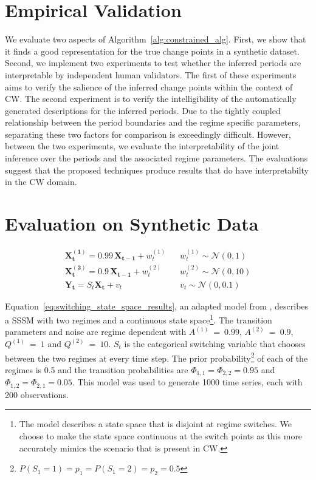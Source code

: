 \section{Empirical Validation}\label{sec:user_evaluation}
We evaluate two aspects of Algorithm~\ref{alg:constrained_alg}. First, we show that it finds a good representation for the true change points in a synthetic dataset. Second, we implement two experiments to test whether the inferred periods are interpretable by independent human validators. The first of these experiments aims to verify the salience of the inferred change points within the context of CW. The second experiment is to verify the intelligibility of the automatically generated descriptions for the inferred periods. Due to the tightly coupled relationship between the period boundaries and the regime specific parameters, separating these two factors for comparison is exceedingly difficult. However, between the two experiments, we evaluate the interpretability of the joint inference over the periods and the associated regime parameters. The evaluations suggest that the proposed techniques produce results that do have interpretabilty in the CW domain.

\section{Evaluation on Synthetic Data}

\begin{equation}
  \begin{split}
      \mathbf{X^{(1)}_t} = 0.99 \,\mathbf{X_{t-1}} + w^{(1)}_t \hspace{10pt} & w^{(1)}_t \sim \mathcal{N}(0,1) \\
      \mathbf{X^{(2)}_t} = 0.9 \,\mathbf{X_{t-1}} + w^{(2)}_t \hspace{10pt} & w^{(2)}_t \sim \mathcal{N}(0,10) \\
      \mathbf{Y_t} = S_t\mathbf{X_t} + v_t \hspace{10pt} & v_t \sim \mathcal{N}(0,0.1)
  \end{split}\label{eq:switching_state_space_results}
\end{equation}

Equation~\ref{eq:switching_state_space_results}, an adapted model from \citet{ghahramani2000variational}, describes a SSSM with two regimes and a continuous state space\footnote{The \citet{ghahramani2000variational} model describes a state space that is disjoint at regime switches. We choose to make the state space continuous at the switch points as this more accurately mimics the scenario that is present in CW.}. The transition parameters and noise are regime dependent with $A^{(1)}~=~0.99$, $A^{(2)}~=~0.9$, $Q^{(1)}~=~1$ and $Q^{(2)}~=~10$. $S_t$ is the categorical switching variable that chooses between the two regimes at every time step. The prior probability\footnote{$P(S_1=1)=p_1=P(S_1=2)=p_2=0.5$} of each of the regimes is 0.5 and the transition probabilities are $\Phi_{1,1} = \Phi_{2,2} = 0.95$ and $\Phi_{1,2} = \Phi_{2,1} = 0.05$. This model was used to generate 1000 time series, each with 200 observations.

